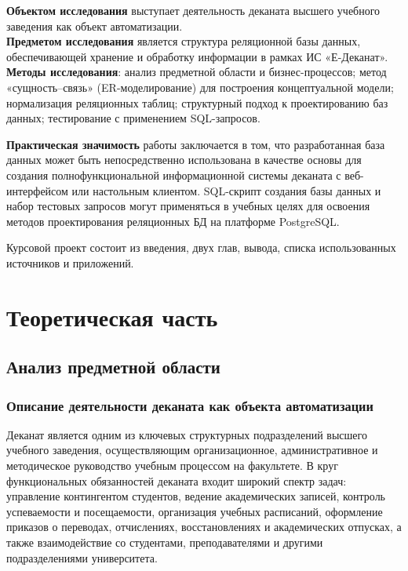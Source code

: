 \documentclass[14pt, a4paper]{extreport}
\begin{document}
\textbf{Объектом исследования} выступает деятельность деканата высшего учебного заведения как объект автоматизации.\\
\textbf{Предметом исследования} является структура реляционной базы данных, обеспечивающей хранение и обработку информации в рамках ИС «Е-Деканат».\\
\textbf{Методы исследования}: анализ предметной области и бизнес-процессов; метод «сущность--связь» (ER-моделирование) для построения концептуальной модели; нормализация реляционных таблиц; структурный подход к проектированию баз данных; тестирование с применением SQL-запросов.

\textbf{Практическая значимость} работы заключается в том, что разработанная база данных может быть непосредственно использована в качестве основы для создания полнофункциональной информационной системы деканата с веб-интерфейсом или настольным клиентом. SQL-скрипт создания базы данных и набор тестовых запросов могут применяться в учебных целях для освоения методов проектирования реляционных БД на платформе PostgreSQL.

Курсовой проект состоит из введения, двух глав, вывода, списка использованных источников и приложений.

\chapter{Теоретическая часть}

\section{Анализ предметной области}

\subsection{Описание деятельности деканата как объекта автоматизации}
Деканат является одним из ключевых структурных подразделений высшего учебного заведения, осуществляющим организационное, административное и методическое руководство учебным процессом на факультете. В круг функциональных обязанностей деканата входит широкий спектр задач: управление контингентом студентов, ведение академических записей, контроль успеваемости и посещаемости, организация учебных расписаний, оформление приказов о переводах, отчислениях, восстановлениях и академических отпусках, а также взаимодействие со студентами, преподавателями и другими подразделениями университета.
\end{document}
